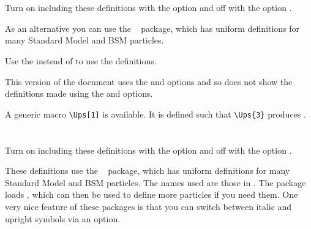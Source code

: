 \documentclass[UKenglish,texlive=2016]{\ATLASLATEXPATH atlasdoc}
\begin{document}
\maketitle

\tableofcontents




\twocolumn
\section{}

Turn on including these definitions with the option  and off with the option .

As an alternative you can use the ~\cite{hepparticles} package,
which has uniform definitions for many Standard Model and BSM particles.

Use the  instead of  to use the  definitions.

This version of the document uses the  and  options and so
does not show the definitions made using the  and  options.
%

A generic macro \verb|\Ups[1]| is available.
It is defined such that \verb|\Ups{3}| produces .


\newpage
\section{}

Turn on including these definitions with the option  and off with the option .

These definitions use the ~\cite{hepparticles} package,
which has uniform definitions for many Standard Model and BSM particles.
The names used are those in .
The package loads , which can then be used to define more particles if you need them.
One very nice feature of these packages is that you can switch between italic and upright symbols via an option.


\end{document}
